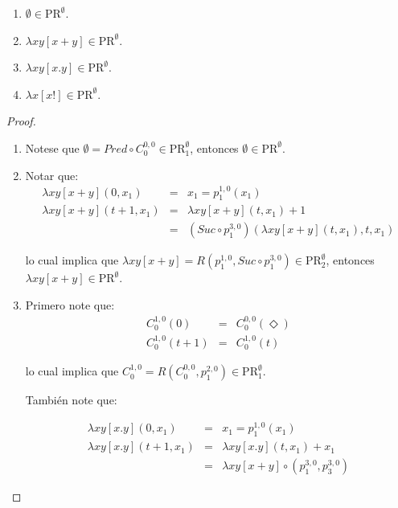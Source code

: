   \begin{lemma}
    \begin{enumerate}
      \item $\emptyset \in \mathrm{PR}^{\emptyset}$.
      \item $\lambda xy \left[x+y\right] \in \mathrm{PR}^{\emptyset}$.
      \item $\lambda xy\left[x.y\right] \in \mathrm{PR}^{\emptyset}$.
      \item $\lambda x\left[x!\right] \in \mathrm{PR}^{\emptyset}$.
    \end{enumerate}
  \end{lemma}
  \begin{proof}
    \begin{enumerate}
      \item Notese que $\emptyset = Pred \circ C_{0}^{0,0} \in \mathrm{PR}_{1}^{\emptyset}$, entonces $\emptyset \in
        \mathrm{PR}^{\emptyset}$.
      \item Notar que:
        \begin{eqnarray}
          \nonumber \lambda xy \left[x+y\right](0, x_{1}) &=& x_{1} = p_{1}^{1,0}(x_{1}) \\
          \nonumber \lambda xy \left[x+y\right](t+1, x_{1}) &=& \lambda xy \left[x+y\right](t, x_{1}) + 1 \\
          \nonumber & =& (Suc \circ p_{1}^{3,0})(\lambda xy \left[x+y\right](t,x_{1}), t, x_{1})
        \end{eqnarray}

        \par lo cual implica que $\lambda xy \left[x+y\right] = R(p_{1}^{1,0}, Suc \circ p_{1}^{3,0}) \in
        \mathrm{PR}_{2}^{\emptyset}$, entonces $\lambda xy \left[x+y\right] \in \mathrm{PR}^{\emptyset}$.
      \item Primero note que:
        \begin{eqnarray}
          \nonumber C_{0}^{1,0}(0) &=& C_{0}^{0,0}(\Diamond) \\
          \nonumber C_{0}^{1,0}(t+1) &=& C_{0}^{1,0}(t)
        \end{eqnarray}

        \par lo cual implica que $C_{0}^{1,0} = R(C_{0}^{0,0}, p_{1}^{2,0}) \in \mathrm{PR}_{1}^{\emptyset}$.
        \par También note que:

        \begin{eqnarray}
          \nonumber \lambda xy \left[x.y\right](0, x_{1}) &=& x_{1} = p_{1}^{1,0}(x_{1}) \\
          \nonumber \lambda xy \left[x.y\right](t+1, x_{1}) &=& \lambda xy \left[x.y\right](t, x_{1}) + x_{1} \\
          \nonumber &=& \lambda xy \left[x+y\right] \circ (p_{1}^{3,0}, p_{3}^{3,0})
        \end{eqnarray}


\end{enumerate}
\end{proof}
